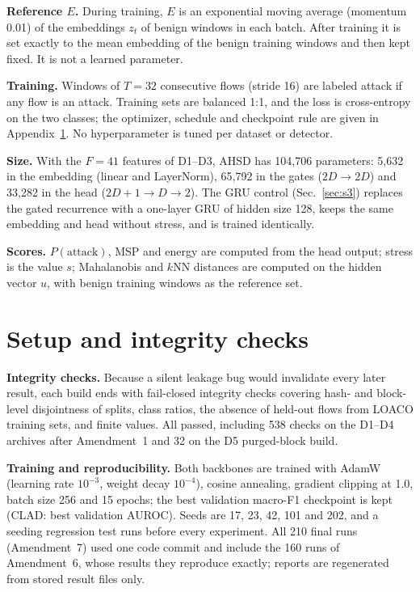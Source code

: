 \textbf{Reference $E$.} During training, $E$ is an exponential moving average (momentum 0.01) of the embeddings $z_t$ of benign windows in each batch. After training it is set exactly to the mean embedding of the benign training windows and then kept fixed. It is not a learned parameter.

\textbf{Training.} Windows of $T=32$ consecutive flows (stride 16) are labeled attack if any flow is an attack. Training sets are balanced 1:1, and the loss is cross-entropy on the two classes; the optimizer, schedule and checkpoint rule are given in Appendix~\ref{app:setup}. No hyperparameter is tuned per dataset or detector.

\textbf{Size.} With the $F=41$ features of D1--D3, AHSD has 104,706 parameters: 5,632 in the embedding (linear and LayerNorm), 65,792 in the gates ($2D\!\to\!2D$) and 33,282 in the head ($2D{+}1\!\to\!D\!\to\!2$). The GRU control (Sec.~\ref{sec:s3}) replaces the gated recurrence with a one-layer GRU of hidden size 128, keeps the same embedding and head without stress, and is trained identically.

\textbf{Scores.} $P(\text{attack})$, MSP and energy are computed from the head output; stress is the value $s$; Mahalanobis and $k$NN distances are computed on the hidden vector $u$, with benign training windows as the reference set.

\section{Setup and integrity checks}
\label{app:setup}

\textbf{Integrity checks.} Because a silent leakage bug would invalidate every later result, each build ends with fail-closed integrity checks covering hash- and block-level disjointness of splits, class ratios, the absence of held-out flows from LOACO training sets, and finite values. All passed, including 538 checks on the D1--D4 archives after Amendment~1 and 32 on the D5 purged-block build.

\textbf{Training and reproducibility.} Both backbones are trained with AdamW (learning rate $10^{-3}$, weight decay $10^{-4}$), cosine annealing, gradient clipping at 1.0, batch size 256 and 15 epochs; the best validation macro-F1 checkpoint is kept (CLAD: best validation AUROC). Seeds are 17, 23, 42, 101 and 202, and a seeding regression test runs before every experiment. All 210 final runs (Amendment~7) used one code commit and include the 160 runs of Amendment~6, whose results they reproduce exactly; reports are regenerated from stored result files only.

